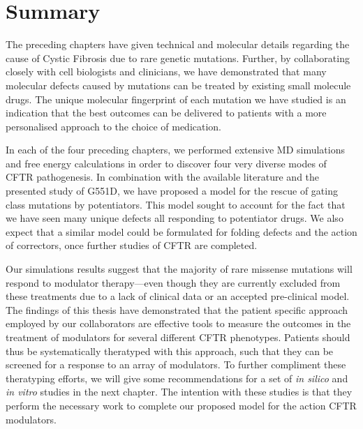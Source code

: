 

\section{Summary}
The preceding chapters have given technical and molecular details regarding the cause of Cystic Fibrosis due to rare genetic mutations. Further, by collaborating closely with cell biologists and clinicians, we have demonstrated that many molecular defects caused by mutations can be treated by existing small molecule drugs. The unique molecular fingerprint of each mutation we have studied is an indication that the best outcomes can be delivered to patients with a more personalised approach to the choice of medication. 

In each of the four preceding chapters, we performed extensive MD simulations and free energy calculations in order to discover four very diverse modes of CFTR pathogenesis. In combination with the available literature and the presented study of G551D, we have proposed a model for the rescue of gating class mutations by potentiators. This model sought to account for the fact that we have seen many unique defects all responding to potentiator drugs. We also expect that a similar model could be formulated for folding defects and the action of correctors, once further studies of CFTR are completed. 

Our simulations results suggest that the majority of rare missense mutations will respond to modulator therapy---even though they are currently excluded from these treatments due to a lack of clinical data or an accepted pre-clinical model. The findings of this thesis have demonstrated that the patient specific approach employed by our collaborators are effective tools to measure the outcomes in the treatment of modulators for several different CFTR phenotypes. Patients should thus be systematically theratyped with this approach, such that they can be screened for a response to an array of modulators. To further compliment these theratyping efforts, we will give some recommendations for a set of \textit{in silico} and \textit{in vitro} studies in the next chapter. The intention with these studies is that they perform the necessary work to complete our proposed model for the action CFTR modulators.

